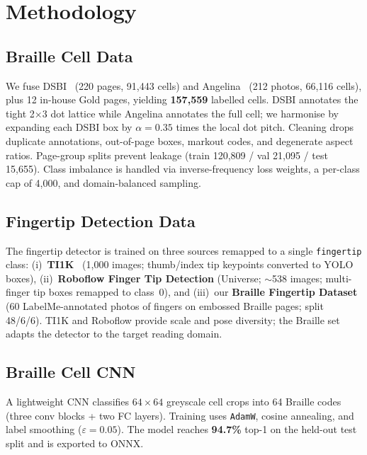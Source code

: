 \documentclass{article}
\begin{document}
\section{Methodology}

\subsection{Braille Cell Data}

We fuse DSBI~\cite{dsbi2019} (220 pages, 91,443 cells) and
Angelina~\cite{angel2021} (212 photos, 66,116 cells), plus 12 in-house
Gold pages, yielding \textbf{157,559} labelled cells.  DSBI annotates the
tight 2$\times$3 dot lattice while Angelina annotates the full cell; we
harmonise by expanding each DSBI box by $\alpha{=}0.35$ times the local
dot pitch.  Cleaning drops duplicate annotations, out-of-page boxes,
markout codes, and degenerate aspect ratios.  Page-group splits prevent
leakage (train 120,809 / val 21,095 / test 15,655).  Class imbalance is
handled via inverse-frequency loss weights, a per-class cap of 4,000, and
domain-balanced sampling.

\subsection{Fingertip Detection Data}

The fingertip detector is trained on three sources remapped to a single
\texttt{fingertip} class: (i)~\textbf{TI1K}~\cite{alam2019ti1k} (1,000 images;
thumb/index tip keypoints converted to YOLO boxes),
(ii)~\textbf{Roboflow Finger Tip Detection} (Universe; $\sim$538 images;
multi-finger tip boxes remapped to class~0), and (iii)~our
\textbf{Braille Fingertip Dataset} (60 LabelMe-annotated photos of fingers
on embossed Braille pages; split 48/6/6).  TI1K and Roboflow provide scale
and pose diversity; the Braille set adapts the detector to the target
reading domain.

\subsection{Braille Cell CNN}

A lightweight CNN classifies $64\times64$ greyscale cell crops into 64
Braille codes (three conv blocks + two FC layers).  Training uses
\texttt{AdamW}, cosine annealing, and label smoothing
($\varepsilon{=}0.05$).  The model reaches \textbf{94.7\%} top-1 on the
held-out test split and is exported to ONNX.
\end{document}
